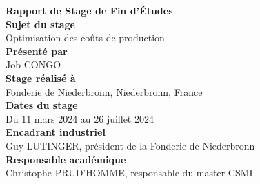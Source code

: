 \documentclass[12pt]{article}
\begin{document}
\begin{titlepage}
    \centering
    
    {\Huge \textbf{Rapport de Stage de Fin d'Études}} \\[1.5cm]
    {\large \textbf{Sujet du stage }} \\
    {\Large Optimisation des coûts de production} \\[2cm]
    
    {\Large \textbf{Présenté par }} \\
    {\Large Job CONGO} \\[1cm]
    
    {\large \textbf{Stage réalisé à }} \\
    {\large Fonderie de Niederbronn, Niederbronn, France} \\[0.5cm]

    {\large \textbf{Dates du stage }} \\
    {\large Du 11 mars 2024 au 26 juillet 2024} \\[1cm]

    {\large \textbf{Encadrant industriel }} \\
    {\large Guy LUTINGER, président de la Fonderie de Niederbronn} \\[0.5cm]
    

    {\large \textbf{Responsable académique }} \\
    {\large Christophe PRUD’HOMME, responsable du master CSMI} \\[2cm]
    

\end{titlepage}
\end{document}

